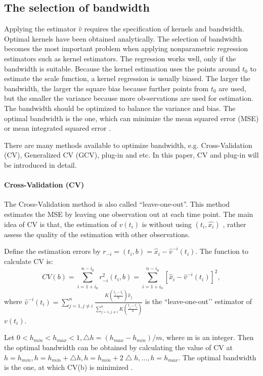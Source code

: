 \subsection{The selection of bandwidth}
Applying the estimator $\hat{v}$  requires the specification of kernels and bandwidth. Optimal kernels have been obtained analytically. The selection of bandwidth becomes the most important problem when applying nonparametric regression estimators such as kernel estimators. The regression works well, only if the bandwidth is suitable. Because the kernel estimation uses the points around $t_{0}$  to estimate the scale function, a kernel regression is usually biased. The larger the bandwidth, the larger the square bias because further points from $t_{0}$ are used, but the smaller the variance because more ob-servations are used for estimation. The bandwidth should be optimized to balance the variance and bias. The optimal bandwidth is the one, which can minimize the mean squared error (MSE) or mean integrated squared error \cite{Gasser1991}. 

There are many methods available to optimize bandwidth, e.g. Cross-Validation (CV), Generalized CV (GCV), plug-in and etc. In this paper, CV and plug-in will be introduced in detail.

\paragraph{Cross-Validation (CV)}

The Cross-Validation method is also called “leave-one-out”.  This method estimates the MSE by leaving one observation out at each time point. The main idea of CV is that, the estimation of $v(t_{i})$ is without using $(t_{i},\hat{x_{i}})$  , rather assess the quality of the estimation with other observations. 

Define the estimation errors by $r_{-i}=(t_{i},b)=\hat{x}_{i}-\hat{v}^{-i}(t_{i})$. The function to calculate CV is:
\begin{equation}
CV(b) = \sum_{i=1+i_{0}}^{n-i_{0}}r_{-i}^{2}(t_{i},b)=\sum_{i=1+i_{0}}^{n-i_{0}}[\hat{x}_{i}-\hat{v}^{-i}(t_{i})]^{2},
\end{equation}
where $\hat{v}^{-i}(t_i)=\sum_{j=1,j\neq i}^{n}\frac{K(\frac{t_{j}-t_{i}}{b})\hat{x}_{j}}{\sum_{j=1,j \neq i}^{n}K(\frac{t_{j}-t_{i}}{b})}$ is the “leave-one-out’’ estimator of $v(t_{i})$.

Let $0<h_{min}<h_{max}<1, \bigtriangleup h=(h_{max}-h_{min})/m$, where m is an integer. Then the optimal bandwidth can be obtained by calculating the value of CV at $h=h_{min}, h=h_{min} + \bigtriangleup h, h=h_{min} + 2\bigtriangleup h, \ldots, h=h_{max}$. The optimal bandwidth is the one, at which CV(b) is minimized \cite{Sarda1993}.

